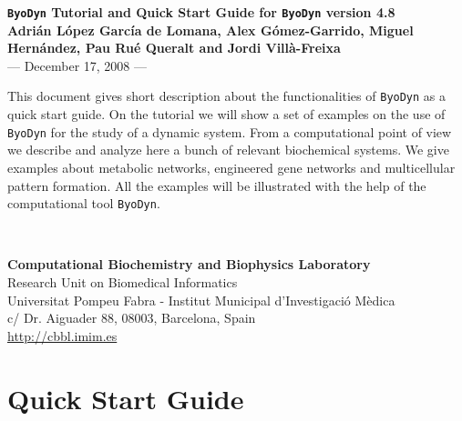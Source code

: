 \documentclass[a4paper, 11pt]{article}
\begin{document}
  \begin{center}
    \thispagestyle{empty}
    \textbf{\Large{\texttt{ByoDyn} Tutorial and Quick Start Guide for \texttt{ByoDyn} version 4.8}}\\[5ex]
    \textbf{Adri\'an L\'opez Garc\'ia de Lomana, Alex G\'omez-Garrido, Miguel Hern\'andez, Pau Ru\'e Queralt and Jordi Vill\`a-Freixa}\\[10ex] --- December 17, 2008 ---\\[10ex]
    \parbox{0.70\linewidth}{
      This document gives short description about the functionalities of \texttt{ByoDyn} as a quick start guide. 
      On the tutorial we will show a set of examples on the use of \texttt{ByoDyn} for the study of a dynamic system.
      From a computational point of view we describe and analyze here a bunch of relevant biochemical systems.
      We give examples about metabolic networks, engineered gene networks and multicellular pattern formation.
      All the examples will be illustrated with the help of the computational tool \texttt{ByoDyn}.
    }\\[40ex]
  \end{center}
  \begin{footnotesize}
    \begin{raggedleft}
      \textbf{Computational Biochemistry and Biophysics Laboratory}\\
      Research Unit on Biomedical Informatics\\
      Universitat Pompeu Fabra - Institut Municipal d'Investigaci\'o M\`edica\\
      c/ Dr. Aiguader 88, 08003, Barcelona, Spain\\
      \url{http://cbbl.imim.es}\\
    \end{raggedleft}
  \end{footnotesize}
  \newpage
  \tableofcontents
  \newpage
  \section{Quick Start Guide}
\end{document}
